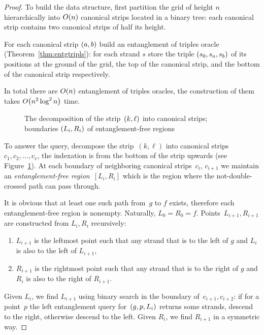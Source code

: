 \documentclass[a4paper,11pt]{article}
\begin{document}
\begin{proof}
	To build the data structure, first partition the grid of height \(n\)
	hierarchically into \(O\lr*{n}\) canonical strips located in a binary tree:
	each canonical strip contains two canonical strips of half its height.

	For each canonical strip \(\lr*{a, b}\) build an entanglement of triples
	oracle (Theorem~\ref{thm:entgtripls}): for each strand \(s\) store the triple
	\(\lr*{s_0, s_a, s_b}\) of its positions at the ground of the grid,
	the top of the canonical strip, and the bottom of
	the canonical strip respectively.

	In total there are \(O\lr*{n}\) entanglement of triples oracles,
	the construction of them takes \(O\lr*{n^2 \log^2 n}\) time.

\begin{figure}[ht] \centering
   
   \caption{The decomposition of the strip~\(\lr*{k, \ell}\) into canonical strips;
            boundaries \(\lr*{L_i, R_i}\) of entanglement-free regions} 
   \label{fig:eostrands}
\end{figure}

	To answer the query, decompose the strip~\((k,\ell)\) into
	canonical strips~\(c_1, c_2, \ldots, c_v\), the indexation is from the bottom
	of the strip upwards (see Figure~\ref{fig:eostrands}). At each
	boundary of neighboring canonical strips~\(c_i\), \(c_{i+1}\) we maintain
	an \emph{entanglement-free region}~\(\left[ L_i, R_i \right]\) which is
	the region where the not-double-crossed path can pass through.

	It is obvious that at least one such path from~\(g\) to \(f\) exists, therefore
	each entanglement-free region is nonempty. Naturally, \(L_0 = R_0 = f\).
	Points~\(L_{i+1}, R_{i+1}\) are constructed from \(L_i, R_i\) recursively:
   \begin{enumerate}
	\item \(L_{i+1}\) is the leftmost point such that any strand that is
	  to the left of \(g\) and \(L_i\) is also to the left of \(L_{i+1}\),
	\item \(R_{i+1}\) is the rightmost point such that any strand that is
	  to the right of \(g\) and \(R_i\) is also to the right of \(R_{i+1}\).
   \end{enumerate}
	Given \(L_i\), we find \(L_{i+1}\) using binary search in the boundary
	of~\(c_{i+1}, c_{i+2}\): if for a point~\(p\) the left entanglement query
	for~\(\lr*{g, p, L_i}\) returns some strands, descend to the right,
	otherwise descend to the left.
	Given \(R_i\), we find \(R_{i+1}\) in a symmetric way.


\end{proof}
\end{document}
